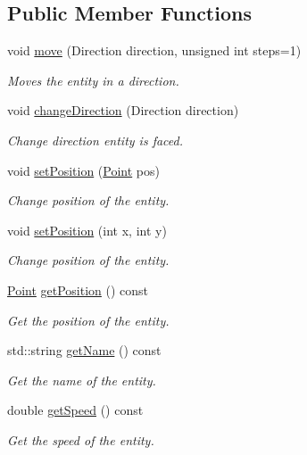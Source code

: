 \subsection*{Public Member Functions}
\begin{DoxyCompactItemize}
\item 
void \hyperlink{classEntity_aba38705a06cf12c0e87b8b42713f3ce7}{move} (Direction direction, unsigned int steps=1)
\begin{DoxyCompactList}\small\item\em Moves the entity in a direction. \end{DoxyCompactList}\item 
void \hyperlink{classEntity_a8c7f316068b48003621f301b24d6ff47}{change\+Direction} (Direction direction)
\begin{DoxyCompactList}\small\item\em Change direction entity is faced. \end{DoxyCompactList}\item 
void \hyperlink{classEntity_abfef59d2e7f81727d43a86425e8e06df}{set\+Position} (\hyperlink{structPoint}{Point} pos)
\begin{DoxyCompactList}\small\item\em Change position of the entity. \end{DoxyCompactList}\item 
void \hyperlink{classEntity_a8871ade33babf42d554f498154f35e26}{set\+Position} (int x, int y)
\begin{DoxyCompactList}\small\item\em Change position of the entity. \end{DoxyCompactList}\item 
\hyperlink{structPoint}{Point} \hyperlink{classEntity_a0db2ab8dd08e0da409133786803bd4e0}{get\+Position} () const
\begin{DoxyCompactList}\small\item\em Get the position of the entity. \end{DoxyCompactList}\item 
std\+::string \hyperlink{classEntity_a403f69eb888da7c5a690b79c658cdf47}{get\+Name} () const
\begin{DoxyCompactList}\small\item\em Get the name of the entity. \end{DoxyCompactList}\item 
double \hyperlink{classEntity_a7cf65c6f73d2a17e59a26344c8ffb999}{get\+Speed} () const
\begin{DoxyCompactList}\small\item\em Get the speed of the entity. \end{DoxyCompactList}\item 

\end{DoxyCompactItemize}
